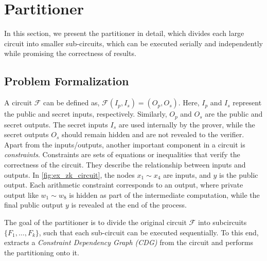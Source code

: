 
\section{Partitioner} \label{sec:partitioner}

In this section, we present the partitioner in detail, which divides each large \zk circuit into smaller sub-circuits, which can be executed serially and independently while promising the correctness of results. 



\subsection{Problem Formalization}



A \zk circuit $\mathcal{F}$ can be defined as,
$\mathcal{F}(I_{p}, I_{s}) = (O_{p}, O_{s})$. Here, $I_{p}$ and $I_{s}$ represent the public and secret inputs, respectively. Similarly, $O_{p}$ and  $O_{s}$ are the public and secret outputs. The secret inputs $I_{s}$ are used internally by the prover, while the secret outputs $O_{s}$ should remain hidden and are not revealed to the verifier.
Apart from the inputs/outputs, another important component in a circuit is \emph{constraints}.  Constraints are sets of equations or inequalities that verify the correctness of the circuit.  They describe the relationship between inputs and outputs. In \cref{fig:ex_zk_circuit},  the nodes  $x_1 \sim x_4$ are inputs, and $y$ is the public output. Each arithmetic constraint corresponds to an output, where private output like $w_1 \sim w_8$ is hidden as part of the intermediate computation, while the final public output $y$ is revealed at the end of the process.



The goal of the partitioner is to divide the original circuit $\mathcal{F}$ into subcircuits  $\{F_1, \ldots, F_k\}$, such that each sub-circuit can be executed sequentially. To this end, \system extracts a \textit{Constraint Dependency Graph (CDG)} from the circuit and performs the partitioning onto it. 

